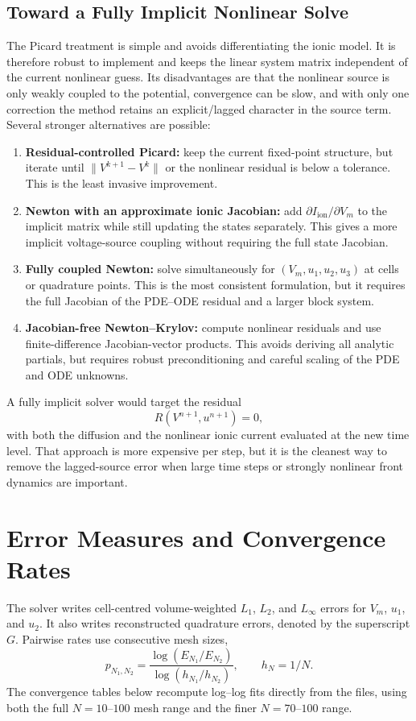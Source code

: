 \documentclass[11pt,a4paper]{article}
\begin{document}
\subsection{Toward a Fully Implicit Nonlinear Solve}
The Picard treatment is simple and avoids differentiating the ionic model. It is
therefore robust to implement and keeps the linear system matrix independent of
the current nonlinear guess. Its disadvantages are that the nonlinear source is
only weakly coupled to the potential, convergence can be slow, and with only one
correction the method retains an explicit/lagged character in the source term.
Several stronger alternatives are possible:
\begin{enumerate}[label=(\roman*)]
\item \textbf{Residual-controlled Picard:} keep the current fixed-point structure,
but iterate until $\|V^{k+1}-V^k\|$ or the nonlinear residual is below a tolerance.
This is the least invasive improvement.
\item \textbf{Newton with an approximate ionic Jacobian:} add
$\partial I_{\mathrm{ion}}/\partial V_m$ to the implicit matrix while still
updating the states separately. This gives a more implicit voltage-source
coupling without requiring the full state Jacobian.
\item \textbf{Fully coupled Newton:} solve simultaneously for
$(V_m,u_1,u_2,u_3)$ at cells or quadrature points. This is the most consistent
formulation, but it requires the full Jacobian of the PDE--ODE residual and a
larger block system.
\item \textbf{Jacobian-free Newton--Krylov:} compute nonlinear residuals and use
finite-difference Jacobian-vector products. This avoids deriving all analytic
partials, but requires robust preconditioning and careful scaling of the PDE and
ODE unknowns.
\end{enumerate}
A fully implicit solver would target the residual
\begin{equation}
R(V^{n+1},u^{n+1}) = 0,
\end{equation}
with both the diffusion and the nonlinear ionic current evaluated at the new
time level. That approach is more expensive per step, but it is the cleanest way
to remove the lagged-source error when large time steps or strongly nonlinear
front dynamics are important.

\section{Error Measures and Convergence Rates}
The solver writes cell-centred volume-weighted $L_1$, $L_2$, and $L_\infty$ errors for $V_m$, $u_1$, and $u_2$. It also writes reconstructed quadrature errors, denoted by the superscript $G$. Pairwise rates use consecutive mesh sizes,
\begin{equation}
p_{N_1,N_2} = \frac{\log(E_{N_1}/E_{N_2})}{\log(h_{N_1}/h_{N_2})}, \qquad h_N=1/N.
\end{equation}
The convergence tables below recompute log--log fits directly from the  files, using both the full $N=10$--$100$ mesh range and the finer $N=70$--$100$ range.
\end{document}
